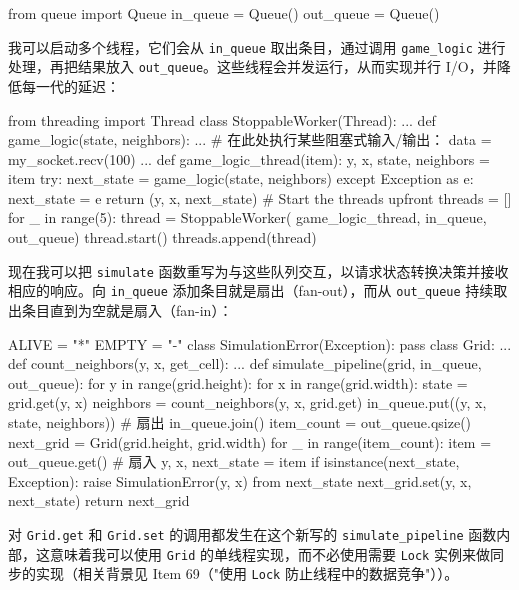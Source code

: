 \begin{codebox}[python]
from queue import Queue
in_queue = Queue()
out_queue = Queue()
\end{codebox}

我可以启动多个线程，它们会从 \texttt{in\_queue} 取出条目，通过调用 \texttt{game\_logic} 进行处理，再把结果放入 \texttt{out\_queue}。这些线程会并发运行，从而实现并行 I/O，并降低每一代的延迟：

\begin{codebox}[python]
from threading import Thread
class StoppableWorker(Thread):
    ...
def game_logic(state, neighbors):
    ...
    # 在此处执行某些阻塞式输入/输出：
    data = my_socket.recv(100)
    ...
def game_logic_thread(item):
    y, x, state, neighbors = item
    try:
        next_state = game_logic(state, neighbors)
    except Exception as e:
        next_state = e
    return (y, x, next_state)
# Start the threads upfront
threads = []
for _ in range(5):
    thread = StoppableWorker(
        game_logic_thread, in_queue, out_queue)
    thread.start()
    threads.append(thread)
\end{codebox}

现在我可以把 \texttt{simulate} 函数重写为与这些队列交互，以请求状态转换决策并接收相应的响应。向 \texttt{in\_queue} 添加条目就是扇出（fan-out），而从 \texttt{out\_queue} 持续取出条目直到为空就是扇入（fan-in）：

\begin{codebox}[python]
ALIVE = "*"
EMPTY = "-"
class SimulationError(Exception):
    pass
class Grid:
    ...
def count_neighbors(y, x, get_cell):
    ...
def simulate_pipeline(grid, in_queue, out_queue):
    for y in range(grid.height):
        for x in range(grid.width):
            state = grid.get(y, x)
            neighbors = count_neighbors(y, x, grid.get)
            in_queue.put((y, x, state, neighbors))  # 扇出
    in_queue.join()
    item_count = out_queue.qsize()
    next_grid = Grid(grid.height, grid.width)
    for _ in range(item_count):
        item = out_queue.get()                      # 扇入
        y, x, next_state = item
        if isinstance(next_state, Exception):
            raise SimulationError(y, x) from next_state
        next_grid.set(y, x, next_state)
    return next_grid
\end{codebox}

对 \texttt{Grid.get} 和 \texttt{Grid.set} 的调用都发生在这个新写的 \texttt{simulate\_pipeline} 函数内部，这意味着我可以使用 \texttt{Grid} 的单线程实现，而不必使用需要 \texttt{Lock} 实例来做同步的实现（相关背景见 Item 69（"使用 \texttt{Lock} 防止线程中的数据竞争"））。

